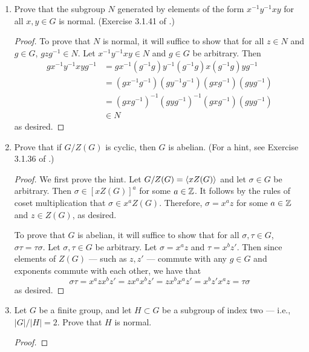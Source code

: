 \documentclass[../psets.tex]{subfiles}
\begin{document}
\begin{enumerate}
\begin{enumerate}
    \end{enumerate}
    \item Prove that the subgroup $N$ generated by elements of the form $x^{-1}y^{-1}xy$ for all $x,y\in G$ is normal. (Exercise 3.1.41 of \textcite{bib:DummitFoote}.)
    \begin{proof}
        To prove that $N$ is normal, it will suffice to show that for all $z\in N$ and $g\in G$, $gzg^{-1}\in N$. Let $x^{-1}y^{-1}xy\in N$ and $g\in G$ be arbitrary. Then
        \begin{align*}
            gx^{-1}y^{-1}xyg^{-1} &= gx^{-1}(g^{-1}g)y^{-1}(g^{-1}g)x(g^{-1}g)yg^{-1}\\
            &= (gx^{-1}g^{-1})(gy^{-1}g^{-1})(gxg^{-1})(gyg^{-1})\\
            &= (gxg^{-1})^{-1}(gyg^{-1})^{-1}(gxg^{-1})(gyg^{-1})\\
            &\in N
        \end{align*}
        as desired.
    \end{proof}
    \item Prove that if $G/Z(G)$ is cyclic, then $G$ is abelian. (For a hint, see Exercise 3.1.36 of \textcite{bib:DummitFoote}.)
    \begin{proof}



        We first prove the hint. Let $G/Z(G)=\left\langle{xZ(G)}\right\rangle$ and let $\sigma\in G$ be arbitrary. Then $\sigma\in[xZ(G)]^a$ for some $a\in\mathbb{Z}$. It follows by the rules of coset multiplication that $\sigma\in x^aZ(G)$. Therefore, $\sigma=x^az$ for some $a\in\mathbb{Z}$ and $z\in Z(G)$, as desired.\par
        To prove that $G$ is abelian, it will suffice to show that for all $\sigma,\tau\in G$, $\sigma\tau=\tau\sigma$. Let $\sigma,\tau\in G$ be arbitrary. Let $\sigma=x^az$ and $\tau=x^bz'$. Then since elements of $Z(G)$ --- such as $z,z'$ --- commute with any $g\in G$ and exponents commute with each other, we have that
        \begin{equation*}
            \sigma\tau = x^azx^bz'
            = zx^ax^bz'
            = zx^bx^az'
            = x^bz'x^az
            = \tau\sigma
        \end{equation*}
        as desired.
    \end{proof}
    \item Let $G$ be a finite group, and let $H\subset G$ be a subgroup of index two --- i.e., $|G|/|H|=2$. Prove that $H$ is normal.
    \begin{proof}


\end{proof}
\end{enumerate}
\end{document}
